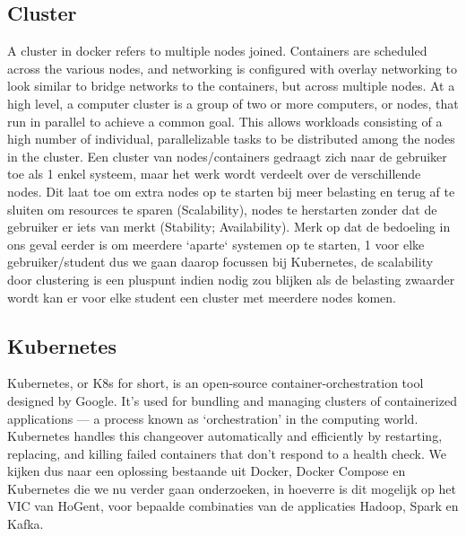 \subsection{Cluster}
A cluster in docker refers to multiple nodes joined. Containers are scheduled across the various nodes, and networking is configured with overlay networking to look similar to bridge networks to the containers, but across multiple nodes.\autocite{BMitch2019}
\newline
\newline
At a high level, a computer cluster is a group of two or more computers, or nodes, that run in parallel to achieve a common goal. This allows workloads consisting of a high number of individual, parallelizable tasks to be distributed among the nodes in the cluster.\autocite{Nordhoff2020}
\newline
\newline
Een cluster van nodes/containers gedraagt zich naar de gebruiker toe als 1 enkel systeem, maar het werk wordt verdeelt over de verschillende nodes. Dit laat toe om extra nodes op te starten bij meer belasting en terug af te sluiten om resources te sparen (Scalability), nodes te herstarten zonder dat de gebruiker er iets van merkt (Stability; Availability).
\newline
\newline
Merk op dat de bedoeling in ons geval eerder is om meerdere `aparte` systemen op te starten, 1 voor elke gebruiker/student dus we gaan daarop focussen bij Kubernetes, de scalability door clustering is een pluspunt indien nodig zou blijken als de belasting zwaarder wordt kan er voor elke student een cluster met meerdere nodes komen.

\subsection{Kubernetes}
Kubernetes, or K8s for short, is an open-source container-orchestration tool designed by Google. It’s used for bundling and managing clusters of containerized applications — a process known as ‘orchestration’ in the computing world.
Kubernetes handles this changeover automatically and efficiently by restarting, replacing, and killing failed containers that don’t respond to a health check.\autocite{Guthrie2022}
\newline
\newline
\newline
We kijken dus naar een oplossing bestaande uit Docker, Docker Compose en Kubernetes die we nu verder gaan onderzoeken, in hoeverre is dit mogelijk op het VIC van HoGent, voor bepaalde combinaties van de applicaties Hadoop, Spark en Kafka.

